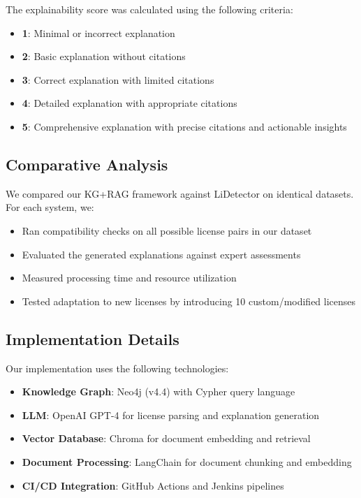 \documentclass[12pt]{article}
\begin{document}
The explainability score was calculated using the following criteria:
\begin{itemize}
    \item \textbf{1}: Minimal or incorrect explanation
    \item \textbf{2}: Basic explanation without citations
    \item \textbf{3}: Correct explanation with limited citations
    \item \textbf{4}: Detailed explanation with appropriate citations
    \item \textbf{5}: Comprehensive explanation with precise citations and actionable insights
\end{itemize}

\subsection{Comparative Analysis}
We compared our KG+RAG framework against LiDetector on identical datasets. For each system, we:

\begin{itemize}
    \item Ran compatibility checks on all possible license pairs in our dataset
    \item Evaluated the generated explanations against expert assessments
    \item Measured processing time and resource utilization
    \item Tested adaptation to new licenses by introducing 10 custom/modified licenses
\end{itemize}

\subsection{Implementation Details}
Our implementation uses the following technologies:

\begin{itemize}
    \item \textbf{Knowledge Graph}: Neo4j (v4.4) with Cypher query language
    \item \textbf{LLM}: OpenAI GPT-4 for license parsing and explanation generation
    \item \textbf{Vector Database}: Chroma for document embedding and retrieval
    \item \textbf{Document Processing}: LangChain for document chunking and embedding
    \item \textbf{CI/CD Integration}: GitHub Actions and Jenkins pipelines
\end{itemize}
\end{document}
